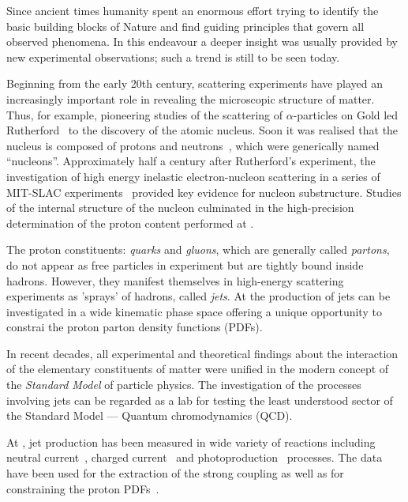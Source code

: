Since ancient times humanity spent an enormous effort trying to identify the basic building blocks of Nature and find guiding principles that govern all observed phenomena. In this endeavour a deeper insight was usually provided by new experimental observations; such a trend is still to be seen today.

Beginning from the early 20th century, scattering experiments have played an increasingly important role in revealing the microscopic structure of matter. Thus, for example, pioneering studies of the scattering of $\alpha$-particles on Gold led Rutherford~\cite{pm:21:669} to the discovery of the atomic nucleus. Soon it was realised that the nucleus is composed of protons and neutrons~\cite{Chadwick:1932ma}, which were generically named ``nucleons''. Approximately half a century after Rutherford's experiment, the investigation of high energy inelastic electron-nucleon scattering in a series of MIT-SLAC experiments~\cite{Panofsky:1968pb, Bloom:1969kc, Briedenbach:1969, Taylor:1991ew, Kendall:1991np} provided key evidence for nucleon substructure. Studies of the internal structure of the nucleon culminated in the high-precision determination of the proton content performed at \hera.

The proton constituents: \emph{quarks} and \emph{gluons}, which are generally called \emph{partons}, do not appear as free particles in experiment but are tightly bound inside hadrons. However, they manifest themselves in high-energy scattering experiments as 'sprays' of hadrons, called \emph{jets}. At \hera the production of jets can be investigated in a wide kinematic phase space offering a unique opportunity to constrai the proton parton density functions (PDFs).

In recent decades, all experimental and theoretical findings about the interaction of the elementary constituents of matter were unified in the modern concept of the \emph{Standard Model} of particle physics. The investigation of the processes involving jets can be regarded as a lab for testing the least understood sector of the Standard Model --- Quantum chromodynamics (QCD).

At \hera, jet production has been measured in wide variety of reactions including neutral current~\cite{epj:c19:289,pl:b547:164,pl:b551:226,np:b765:1,pl:b649:12,epj:c65:363,epj:c67:1,pl:b507:70,epj:c23:13,pl:b515:17,epj:c44:183,pr:d85:052008}, charged current~\cite{epj:c31:149,pr:d78:032004} and photoproduction~\cite{pl:b560:7,epj:c29:497,epj:c11:35,epj:c23:615,pl:b531:9,epj:c25:13,pl:b639:21,pr:d76:072011,pl:b443:394,np:b792:1} processes. The data have been used for the extraction of the strong coupling as well as for constraining the proton PDFs~\cite{epj:c42:1}.


